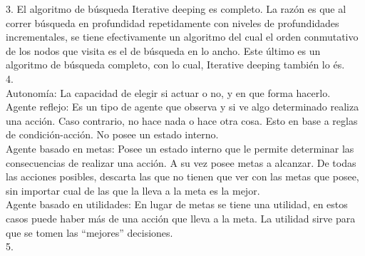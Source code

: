 3. El algoritmo de búsqueda Iterative deeping es completo. La razón es que al correr búsqueda en profundidad repetidamente con niveles de profundidades incrementales, se tiene efectivamente un algoritmo del cual el orden conmutativo de los nodos que visita es el de búsqueda en lo ancho. Este último es un algoritmo de búsqueda completo, con lo cual, Iterative deeping también lo és.\\

4.\\

Autonomía: La capacidad de elegir si actuar o no, y en que forma hacerlo.\\

Agente reflejo: Es un tipo de agente que observa y si ve algo determinado realiza una acción. Caso contrario, no hace nada o hace otra cosa. Esto en base a reglas de condición-acción. No posee un estado interno. \\

Agente basado en metas: Posee un estado interno que le permite determinar las consecuencias de realizar una acción. A su vez posee metas a alcanzar. De todas las acciones posibles, descarta las que no tienen que ver con las metas que posee, sin importar cual de las que la lleva a la meta es la mejor. \\

Agente basado en utilidades: En lugar de metas se tiene una utilidad, en estos casos puede haber más de una acción que lleva a la meta. La utilidad sirve para que se tomen las “mejores” decisiones.\\

5. \\

